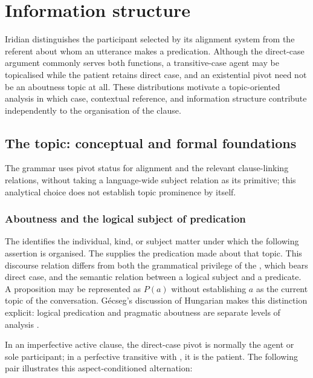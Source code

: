 \chapter{Information structure}\label{ch:infstr}
\label{sec:topic-comment}%

Iridian distinguishes the participant selected by its alignment system from
 the referent about whom an utterance makes a predication. Although the
 direct-case argument commonly serves both functions, a transitive-case agent
 may be topicalised while the patient retains direct case, and an existential
 pivot need not be an aboutness topic at all. These distributions motivate a
 topic-oriented analysis in which case, contextual reference, and information
 structure contribute independently to the organisation of the clause.

\section{The topic: conceptual and formal foundations}\label{sec:tc-foundations}\label{sec:th-topic-comment-theory}
The grammar uses pivot status for alignment and the relevant clause-linking
relations, without taking a language-wide subject relation as its primitive;
this analytical choice does not establish topic prominence by itself.

\subsection{Aboutness and the logical subject of predication}
\label{sec:tc-logical-subject}

The  identifies the individual, kind, or subject matter
 under which the following assertion is organised. The  supplies
 the predication made about that topic. This discourse relation differs from
 both the grammatical privilege of the , which bears
 direct case, and the semantic relation between a logical subject and a
 predicate. A proposition may be represented as $P(a)$ without establishing
 $a$ as the current topic of the conversation. Gécseg's discussion of Hungarian
 makes this distinction explicit: logical predication and pragmatic aboutness
 are separate levels of analysis \cite{gecseg2006}.

In an imperfective active clause, the direct-case pivot is normally the agent
 or sole participant; in a perfective transitive with , it is the
 patient. The following pair illustrates this aspect-conditioned alternation:

